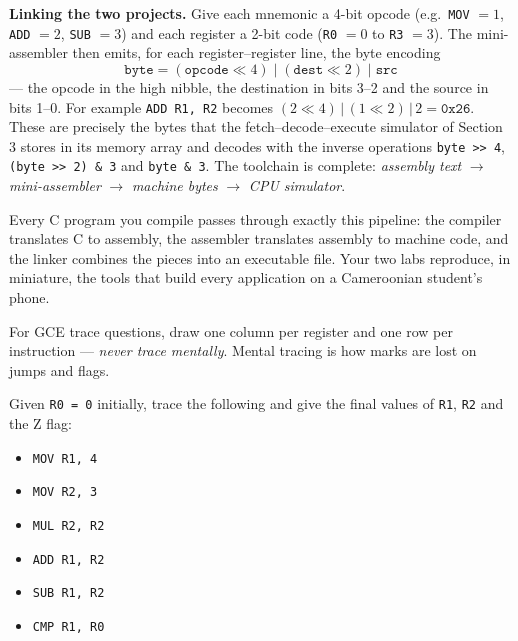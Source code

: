 \documentclass[11pt]{article}
\newcounter{popsec}
\newcounter{popsub}
\newcommand{\courssub}[1]{%
  \stepcounter{popsub}%
  \par\vspace{9pt}\noindent{\popxbold\fontsize{11.5}{13}\selectfont\color{popink}{\color{poporange}\thepopsec.\thepopsub}\hspace{6pt}#1}\par\nopagebreak\vspace{4pt}
}
\begin{document}
\textbf{Linking the two projects.} Give each mnemonic a 4-bit opcode (e.g.\ \texttt{MOV} $= 1$, \texttt{ADD} $= 2$, \texttt{SUB} $= 3$) and each register a 2-bit code (\texttt{R0} $= 0$ to \texttt{R3} $= 3$). The mini-assembler then emits, for each register--register line, the byte encoding
\[ \texttt{byte} = (\texttt{opcode} \ll 4) \;|\; (\texttt{dest} \ll 2) \;|\; \texttt{src} \]
— the opcode in the high nibble, the destination in bits 3--2 and the source in bits 1--0. For example \texttt{ADD R1, R2} becomes $(2 \ll 4) \,|\, (1 \ll 2) \,|\, 2 = \texttt{0x26}$. These are precisely the bytes that the fetch--decode--execute simulator of Section 3 stores in its memory array and decodes with the inverse operations \texttt{byte >> 4}, \texttt{(byte >> 2) \& 3} and \texttt{byte \& 3}. The toolchain is complete: \emph{assembly text} $\rightarrow$ \emph{mini-assembler} $\rightarrow$ \emph{machine bytes} $\rightarrow$ \emph{CPU simulator}.

\begin{savaistu}
Every C program you compile passes through exactly this pipeline: the compiler translates C to assembly, the assembler translates assembly to machine code, and the linker combines the pieces into an executable file. Your two labs reproduce, in miniature, the tools that build every application on a Cameroonian student's phone.
\end{savaistu}

\courssub{GCE-Style Practice}

\begin{methode}
For GCE trace questions, draw one column per register and one row per instruction — \emph{never trace mentally}. Mental tracing is how marks are lost on jumps and flags.
\end{methode}

\begin{exercice}
Given \texttt{R0 = 0} initially, trace the following and give the final values of \texttt{R1}, \texttt{R2} and the Z flag:
\begin{itemize}
\item \texttt{MOV R1, 4}
\item \texttt{MOV R2, 3}
\item \texttt{MUL R2, R2}
\item \texttt{ADD R1, R2}
\item \texttt{SUB R1, R2}
\item \texttt{CMP R1, R0}
\end{itemize}
\end{exercice}
\end{document}
